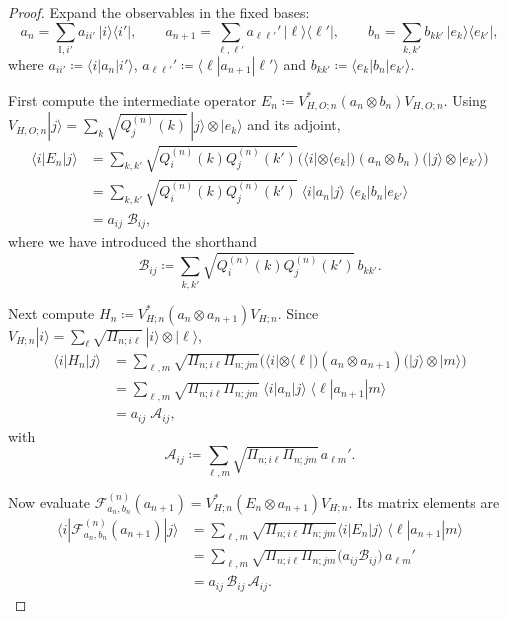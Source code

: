 \documentclass[11pt, reco]{article}
\begin{document}
\begin{proof}
Expand the observables in the fixed bases:
\[
a_n = \sum_{\mathbb{I}, i'} a_{ii'}\,|i\rangle\langle i'|,\qquad
a_{n+1} = \sum_{\ell,\ell'} a_{\ell\ell'}'\,|\ell\rangle\langle\ell'|,\qquad
b_n = \sum_{k,k'} b_{kk'}\,|e_k\rangle\langle e_{k'}|,
\]
where $a_{ii'}\coloneqq\langle i|a_n|i'\rangle$, $a_{\ell\ell'}'\coloneqq\langle\ell|a_{n+1}|\ell'\rangle$ and $b_{kk'}\coloneqq\langle e_k|b_n|e_{k'}\rangle$.

First compute the intermediate operator $E_n\coloneqq V_{H,O;n}^{*}(a_n\otimes b_n)V_{H,O;n}$.
Using $V_{H,O;n}|j\rangle=\sum_k\sqrt{Q^{(n)}_j(k)}\,|j\rangle\otimes|e_k\rangle$ and its adjoint,
\begin{align*}
\langle i|E_n|j\rangle
&=\sum_{k,k'}\sqrt{Q^{(n)}_i(k)Q^{(n)}_j(k')}
\bigl(\langle i|\otimes\langle e_k|\bigr)(a_n\otimes b_n)\bigl(|j\rangle\otimes|e_{k'}\rangle\bigr)\\
&=\sum_{k,k'}\sqrt{Q^{(n)}_i(k)Q^{(n)}_j(k')}\;
\langle i|a_n|j\rangle\;\langle e_k|b_n|e_{k'}\rangle \\
&=a_{ij}\;\mathcal{B}_{ij},
\end{align*}
where we have introduced the shorthand
\[
\mathcal{B}_{ij}\coloneqq\sum_{k,k'}\sqrt{Q^{(n)}_i(k)Q^{(n)}_j(k')}\,b_{kk'}.
\]

Next compute $H_n\coloneqq V_{H;n}^{*}(a_n\otimes a_{n+1})V_{H;n}$.
Since $V_{H;n}|i\rangle=\sum_\ell\sqrt{\Pi_{n;i\ell}}\,|i\rangle\otimes|\ell\rangle$,
\begin{align*}
\langle i|H_n|j\rangle
&=\sum_{\ell,m}\sqrt{\Pi_{n;i\ell}\Pi_{n;jm}}
\bigl(\langle i|\otimes\langle\ell|\bigr)(a_n\otimes a_{n+1})\bigl(|j\rangle\otimes|m\rangle\bigr)\\
&=\sum_{\ell,m}\sqrt{\Pi_{n;i\ell}\Pi_{n;jm}}\;
\langle i|a_n|j\rangle\;\langle\ell|a_{n+1}|m\rangle \\
&=a_{ij}\;\mathcal{A}_{ij},
\end{align*}
with
\[
\mathcal{A}_{ij}\coloneqq\sum_{\ell,m}\sqrt{\Pi_{n;i\ell}\Pi_{n;jm}}\,a_{\ell m}'.
\]

Now evaluate $\mathcal{F}_{a_n,b_n}^{(n)}(a_{n+1})=V_{H;n}^{*}(E_n\otimes a_{n+1})V_{H;n}$.
Its matrix elements are
\begin{align*}
\langle i|\mathcal{F}_{a_n,b_n}^{(n)}(a_{n+1})|j\rangle
&=\sum_{\ell,m}\sqrt{\Pi_{n;i\ell}\Pi_{n;jm}}
\langle i|E_n|j\rangle\;\langle\ell|a_{n+1}|m\rangle \\
&=\sum_{\ell,m}\sqrt{\Pi_{n;i\ell}\Pi_{n;jm}}
\bigl(a_{ij}\mathcal{B}_{ij}\bigr)\,a_{\ell m}' \\
&=a_{ij}\,\mathcal{B}_{ij}\,\mathcal{A}_{ij}.
\end{align*}


\end{proof}
\end{document}
